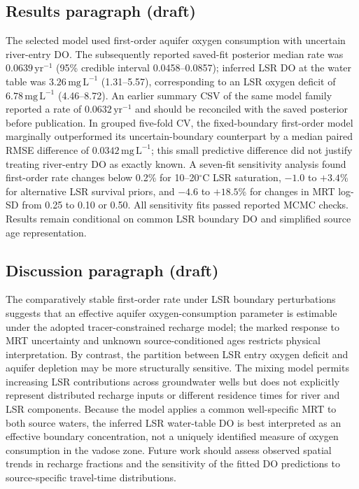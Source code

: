 \documentclass[11pt,a4paper]{article}
\newcommand{\mgL}{\mathrm{mg\,L^{-1}}}
\newcommand{\yr}{\mathrm{yr}}
\begin{document}
\subsection*{Results paragraph (draft)}
The selected model used first-order aquifer oxygen consumption with uncertain river-entry DO. The subsequently reported saved-fit posterior median rate was $0.0639\,\yr^{-1}$ (95\% credible interval 0.0458--0.0857); inferred LSR DO at the water table was $3.26\,\mgL$ (1.31--5.57), corresponding to an LSR oxygen deficit of $6.78\,\mgL$ (4.46--8.72). An earlier summary CSV of the same model family reported a rate of $0.0632\,\yr^{-1}$ and should be reconciled with the saved posterior before publication. In grouped five-fold CV, the fixed-boundary first-order model marginally outperformed its uncertain-boundary counterpart by a median paired RMSE difference of $0.0342\,\mgL$; this small predictive difference did not justify treating river-entry DO as exactly known. A seven-fit sensitivity analysis found first-order rate changes below 0.2\% for 10--20$^\circ$C LSR saturation, $-1.0$ to $+3.4$\% for alternative LSR survival priors, and $-4.6$ to $+18.5$\% for changes in MRT log-SD from 0.25 to 0.10 or 0.50. All sensitivity fits passed reported MCMC checks. Results remain conditional on common LSR boundary DO and simplified source age representation.

\subsection*{Discussion paragraph (draft)}
The comparatively stable first-order rate under LSR boundary perturbations suggests that an effective aquifer oxygen-consumption parameter is estimable under the adopted tracer-constrained recharge model; the marked response to MRT uncertainty and unknown source-conditioned ages restricts physical interpretation. By contrast, the partition between LSR entry oxygen deficit and aquifer depletion may be more structurally sensitive. The mixing model permits increasing LSR contributions across groundwater wells but does not explicitly represent distributed recharge inputs or different residence times for river and LSR components. Because the model applies a common well-specific MRT to both source waters, the inferred LSR water-table DO is best interpreted as an effective boundary concentration, not a uniquely identified measure of oxygen consumption in the vadose zone. Future work should assess observed spatial trends in recharge fractions and the sensitivity of the fitted DO predictions to source-specific travel-time distributions.
\end{document}
